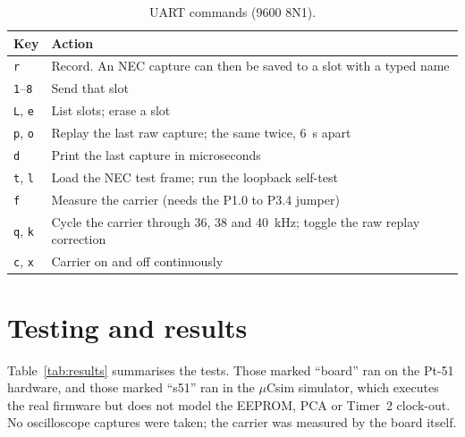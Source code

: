 \documentclass[11pt,a4paper]{article}
\newcommand{\code}[1]{\texttt{#1}}
\begin{document}
\begin{table}[H]
\centering
\caption{UART commands (9600 8N1).}
\label{tab:uart}
\begin{tabularx}{\textwidth}{lL}
\toprule
Key & Action\\
\midrule
\code{r} & Record. An NEC capture can then be saved to a slot with a typed name\\
\code{1}--\code{8} & Send that slot\\
\code{L}, \code{e} & List slots; erase a slot\\
\code{p}, \code{o} & Replay the last raw capture; the same twice, \qty{6}{\second} apart\\
\code{d} & Print the last capture in microseconds\\
\code{t}, \code{l} & Load the NEC test frame; run the loopback self-test\\
\code{f} & Measure the carrier (needs the P1.0 to P3.4 jumper)\\
\code{q}, \code{k} & Cycle the carrier through 36, 38 and \qty{40}{\kilo\hertz}; toggle the raw replay correction\\
\code{c}, \code{x} & Carrier on and off continuously\\
\bottomrule
\end{tabularx}
\end{table}

\section{Testing and results}

Table~\ref{tab:results} summarises the tests. Those marked ``board'' ran on the Pt-51 hardware, and those marked ``s51'' ran in the $\mu$Csim simulator, which executes the real firmware but does not model the EEPROM, PCA or Timer~2 clock-out. No oscilloscope captures were taken; the carrier was measured by the board itself.
\end{document}
